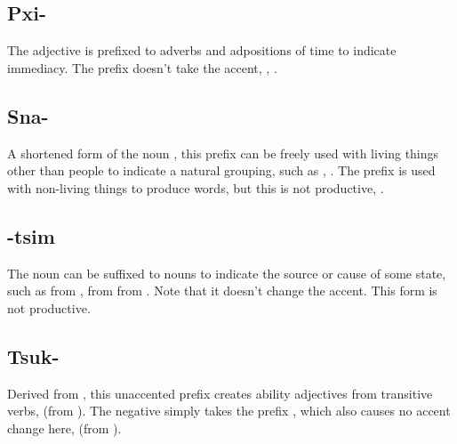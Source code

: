 \subsection{Pxi-} The adjective   is prefixed to
adverbs and adpositions of time to indicate immediacy.  The prefix
doesn't take the accent,  ,
 .

\subsection{Sna-} A shortened form of the noun  , this prefix can be freely used with living
things other than people to indicate a natural grouping, such as
 ,  .  The prefix is used with non-living things to produce words,
but this is not productive,  .

\subsection{-tsim} The noun   can be suffixed to
nouns to indicate the source or cause of some state, such
as  
from  ,   from  
 
from  .  Note that
it doesn't change the accent.  This form is not productive.

\subsection{Tsuk-} Derived from , this unaccented prefix
creates ability adjectives from transitive verbs, 
 (from  ).  The negative simply takes the
prefix , which also causes no accent change here,
  (from  ).

